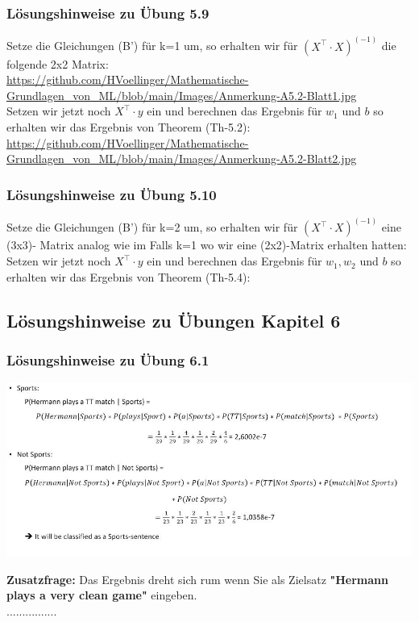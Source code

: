 \documentclass[12pt]{article}
\begin{document}
\subsubsection{Lösungshinweise zu Übung 5.9}
%
Setze die Gleichungen (B') für k=1 um, so erhalten wir für $(X^\top \cdot X)^{(-1)}$ die folgende 2x2 Matrix:\\
\url{https://github.com/HVoellinger/Mathematische-Grundlagen_von_ML/blob/main/Images/Anmerkung-A5.2-Blatt1.jpg}  \\
Setzen wir jetzt noch $X^\top \cdot y $ ein und berechnen das Ergebnis für $w_1$ und $b$ so erhalten wir das Ergebnis von Theorem (Th-5.2):\\
\url{https://github.com/HVoellinger/Mathematische-Grundlagen_von_ML/blob/main/Images/Anmerkung-A5.2-Blatt2.jpg}\\
%
\subsubsection{Lösungshinweise zu Übung 5.10}
%
Setze die Gleichungen (B') für k=2 um, so erhalten wir für $(X^\top \cdot X)^{(-1)}$ eine (3x3)- Matrix analog wie im Falls k=1 wo wir eine (2x2)-Matrix erhalten hatten:\\
Setzen wir jetzt noch $X^\top \cdot y $ ein und berechnen das Ergebnis für $w_1, w_2$ und $b$ so erhalten wir das Ergebnis von Theorem (Th-5.4):\\

\newpage

\subsection{Lösungshinweise zu Übungen Kapitel 6}

\subsubsection{Lösungshinweise zu Übung 6.1}

\begin{center} 
\includegraphics[width=1.1\textwidth]{Naive-Bayes-Ueb61_Hinweis}
\end{center}
\textbf{Zusatzfrage:} Das Ergebnis dreht sich rum wenn Sie als Zielsatz \textbf{"Hermann plays a very clean game"} eingeben.\\................
\end{document}
